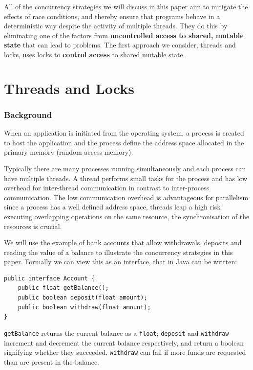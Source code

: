 \documentclass[a4paper,12pt]{kth-mag}
\begin{document}
All of the concurrency strategies we will discuss in this paper aim to mitigate the effects of race conditions, and thereby ensure that programs behave in a deterministic way despite the activity of multiple threads. They do this by eliminating one of the factors from \textbf{uncontrolled access to shared, mutable state} that can lead to problems. The first approach we consider, threads and locks, uses locks to \textbf{control access} to shared mutable state.

\part{Threads and Locks}

\section{Background}
When an application is initiated from the operating system, a process is created to host the application and the process define the address space allocated in the primary memory (random access memory). 

Typically there are many processes running simultaneously and each process can have multiple threads. A thread performs small tasks for the process and has low overhead for inter-thread communication in contrast to inter-process communication. The low communication overhead is advantageous for parallelism since a process has a well defined address space, threads leap a high risk executing overlapping operations on the same resource, the synchronisation of the resources is crucial.

We will use the example of bank accounts that allow withdrawals, deposits and reading the value of a balance to illustrate the concurrency strategies in this paper. Formally we can view this as an interface, that in Java can be written:

\begin{listing}[H]
	\begin{verbatim}
public interface Account {
    public float getBalance();
    public boolean deposit(float amount);
    public boolean withdraw(float amount);
}
  	\end{verbatim}
\end{listing}

\texttt{getBalance} returns the current balance as a \texttt{float}; \texttt{deposit} and \texttt{withdraw} increment and decrement the current balance respectively, and return a boolean signifying whether they succeeded. \texttt{withdraw} can fail if more funds are requested than are present in the balance.
\end{document}
